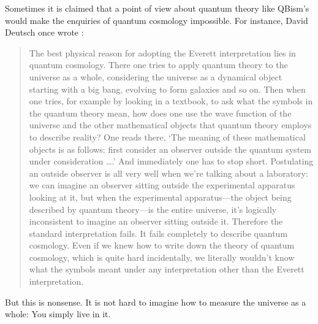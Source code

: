 \documentclass[aps,pra,superscriptaddress,10pt,tightenlines,twocolumn,nofootinbib]{revtex4}
\begin{document}
Sometimes it is claimed that a point of view about quantum theory like QBism's would make the enquiries of quantum cosmology impossible.  For instance, David Deutsch once wrote \cite{Deutsch86}:
\begin{quote}
 \noindent The best physical reason for adopting the Everett interpretation lies in quantum cosmology.  There one tries to apply quantum theory to the universe as a whole, considering the universe as a dynamical object starting with a big bang, evolving to form galaxies and so on. Then when one tries, for example by looking in a textbook, to ask what the symbols in the quantum theory mean, how does one use the wave function of the universe and the other mathematical objects that quantum theory employs to describe reality?  One reads there, `The meaning of these mathematical objects is as follows:  first consider an observer outside the quantum system under consideration \ldots.' And immediately one has to stop short.  Postulating an outside observer is all very well when we're talking about a laboratory:  we can imagine an observer sitting outside the experimental apparatus looking at it, but when the experimental apparatus---the object being described by quantum theory---is the entire universe, it's logically inconsistent to imagine an observer sitting outside it. Therefore the standard interpretation fails.  It fails completely to describe quantum cosmology.  Even if we knew how to write down the theory of quantum cosmology, which is quite hard incidentally, we literally wouldn't know what the symbols meant under any interpretation other than the Everett interpretation.
\end{quote}
But this is nonsense.  It is not hard to imagine how to measure the universe as a whole:  You simply live in it.
\end{document}
